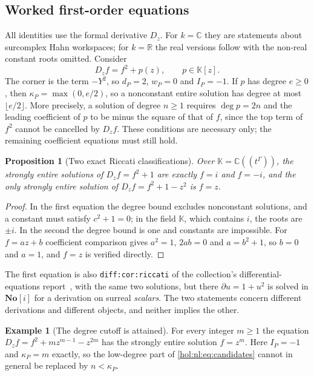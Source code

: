 \documentclass[11pt]{article}
\numberwithin{equation}{section}
\newtheorem{proposition}[theorem]{Proposition}
\theoremstyle{definition}
\newtheorem{example}[theorem]{Example}
\theoremstyle{remark}
\newcommand{\C}{\mathbb C}
\newcommand{\R}{\mathbb R}
\newcommand{\No}{\mathbf{No}}
\newcommand{\KK}{\mathbb K}
\begin{document}
\subsection{Worked first-order equations}\label{hol:nl:sub:examples}

All identities use the formal derivative $D_z$. For $k=\C$ they are statements
about surcomplex Hahn workspaces; for $k=\R$ the real versions follow with the
non-real constant roots omitted. Consider
\begin{equation}\label{hol:nl:eq:riccati}
 D_zf=f^2+p(z),\qquad p\in\KK[z].
\end{equation}
The corner is the term $-Y^2$, so $d_P=2$, $w_P=0$ and $I_P=-1$. If $p$ has
degree $e\ge0$, then $\kappa_P=\max(0,e/2)$, so a nonconstant entire solution
has degree at most $\lfloor e/2\rfloor$. More precisely, a solution of degree
$n\ge1$ requires $\deg p=2n$ and the leading coefficient of $p$ to be minus
the square of that of $f$, since the top term of $f^2$ cannot be cancelled by
$D_zf$. These conditions are necessary only; the remaining coefficient
equations must still hold.

\begin{proposition}[Two exact Riccati classifications]\label{hol:nl:prop:riccati}
Over $\KK=\C((t^\Gamma))$, the strongly entire solutions of $D_zf=f^2+1$ are
exactly $f=i$ and $f=-i$, and the only strongly entire solution of
$D_zf=f^2+1-z^2$ is $f=z$.
\end{proposition}

\begin{proof}
In the first equation the degree bound excludes nonconstant solutions, and a
constant must satisfy $c^2+1=0$; in the field $\KK$, which contains $i$, the
roots are $\pm i$. In the second the degree bound is one and constants are
impossible. For $f=az+b$ coefficient comparison gives $a^2=1$, $2ab=0$ and
$a=b^2+1$, so $b=0$ and $a=1$, and $f=z$ is verified directly.
\end{proof}

The first equation is also \texttt{diff:cor:riccati} of the collection's
differential-equations report~\cite{repodifferential}, with the same two
solutions, but there $\partial u=1+u^2$ is solved in $\No[i]$ for a derivation
on surreal \emph{scalars}. The two statements concern different derivations
and different objects, and neither implies the other.

\begin{example}[The degree cutoff is attained]\label{hol:nl:ex:cutoff}
For every integer $m\ge1$ the equation $D_zf=f^2+mz^{m-1}-z^{2m}$ has the
strongly entire solution $f=z^m$. Here $I_P=-1$ and $\kappa_P=m$ exactly, so
the low-degree part of \eqref{hol:nl:eq:candidates} cannot in general be
replaced by $n<\kappa_P$.
\end{example}
\end{document}
